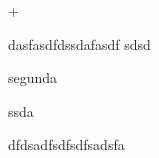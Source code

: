 \documentclass[a4paper, 12pt]{article}
\begin{document}
+
\setcounter{page}{1}

dasfasdfdssdafasdf
sdsd

segunda


ssda



dfdsadfsdfsdfsadsfa








\newpage
\end{document}
